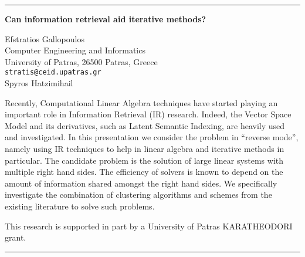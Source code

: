 \documentclass[twosided]{report}
\begin{document}
	\begin{center} \rule{6in}{1pt} \end{center}

\begin{center}
{\large			%
{\bf Can information retrieval aid iterative methods?}}

	Efstratios Gallopoulos \\
	Computer Engineering and Informatics \\
	University of Patras, 26500 Patras, Greece \\
	{\tt stratis@ceid.upatras.gr} \\
	Spyros Hatzimihail
\end{center}
Recently, Computational Linear Algebra techniques have
started playing an important role in Information Retrieval
(IR) research. Indeed, the Vector Space Model and its
derivatives, such as Latent Semantic Indexing, are heavily
used and investigated. In this presentation we consider the
problem in ``reverse mode'', namely using IR techniques to
help in linear algebra and iterative methods in particular.
The candidate problem is the solution of large linear
systems with multiple right hand sides. The efficiency of
solvers is known to depend on the amount of information
shared amongst the right hand sides. We specifically
investigate the combination of clustering algorithms and
schemes from the existing literature to solve such problems.

This research is supported in part by a University of
Patras KARATHEODORI grant.



	\begin{center} \rule{6in}{1pt} \end{center}

\newpage
\end{document}
